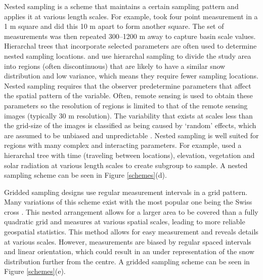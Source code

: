 \documentclass{sfuthesis}
\begin{document}
Nested sampling is a scheme that maintains a certain sampling pattern and applies it at various length scales. For example, \cite{Schweizer2008} took four point measurement in a 1 m square and did this 10 m apart to form another square. The set of measurements was then repeated 300--1200 m away to capture basin scale values. Hierarchal trees that incorporate selected parameters are often used to determine nested sampling locations. \cite{Watson2006} and \cite{Kasurak2011} use hierarchal sampling to divide the study area into regions (often discontinuous) that are likely to have a similar snow distribution and low variance, which means they require fewer sampling locations. Nested sampling requires that the observer predetermine parameters that affect the spatial pattern of the variable. Often, remote sensing is used to obtain these parameters so the resolution of regions is limited to that of the remote sensing images (typically 30 m resolution). The variability that exists at scales less than the grid-size of the images is classified as being caused by `random' effects, which are assumed to be unbiased and unpredictable \citep{Watson2006}. Nested sampling is well suited for regions with many complex and interacting parameters. For example, \cite{Watson2006} used a hierarchal tree with time (traveling between locations), elevation, vegetation and solar radiation at various length scales to create subgroup to sample.  A nested sampling scheme can be seen in Figure \ref{schemes}(d). 

Gridded sampling designs use regular measurement intervals in a grid pattern. Many variations of this scheme exist \citep{Molotch2005a, Kronholm2007, Lopez2011} with the most popular one being the Swiss cross \citep{Kronholm2004}. This nested arrangement allows for a larger area to be covered than a fully quadratic grid and measures at various spatial scales, leading to more reliable geospatial statistics. This method allows for easy measurement and reveals details at various scales. However, measurements are biased by regular spaced intervals and linear orientation, which could result in an under representation of the snow distribution further from the centre. A gridded sampling scheme can be seen in Figure \ref{schemes}(e). 
\end{document}

